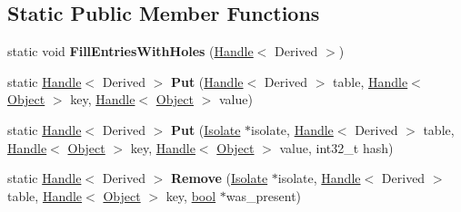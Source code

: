 \subsection*{Static Public Member Functions}
\begin{DoxyCompactItemize}
\item 
\mbox{\label{classv8_1_1internal_1_1ObjectHashTableBase_a45f343e604323fd12be43b0f861d7d16}} 
static void {\bfseries Fill\+Entries\+With\+Holes} (\mbox{\hyperlink{classv8_1_1internal_1_1Handle}{Handle}}$<$ Derived $>$)
\item 
\mbox{\label{classv8_1_1internal_1_1ObjectHashTableBase_ab9fa6b52438643808748dce949159d2f}} 
static \mbox{\hyperlink{classv8_1_1internal_1_1Handle}{Handle}}$<$ Derived $>$ {\bfseries Put} (\mbox{\hyperlink{classv8_1_1internal_1_1Handle}{Handle}}$<$ Derived $>$ table, \mbox{\hyperlink{classv8_1_1internal_1_1Handle}{Handle}}$<$ \mbox{\hyperlink{classv8_1_1internal_1_1Object}{Object}} $>$ key, \mbox{\hyperlink{classv8_1_1internal_1_1Handle}{Handle}}$<$ \mbox{\hyperlink{classv8_1_1internal_1_1Object}{Object}} $>$ value)
\item 
\mbox{\label{classv8_1_1internal_1_1ObjectHashTableBase_a514b023f883de89518605283f832b8f2}} 
static \mbox{\hyperlink{classv8_1_1internal_1_1Handle}{Handle}}$<$ Derived $>$ {\bfseries Put} (\mbox{\hyperlink{classv8_1_1internal_1_1Isolate}{Isolate}} $\ast$isolate, \mbox{\hyperlink{classv8_1_1internal_1_1Handle}{Handle}}$<$ Derived $>$ table, \mbox{\hyperlink{classv8_1_1internal_1_1Handle}{Handle}}$<$ \mbox{\hyperlink{classv8_1_1internal_1_1Object}{Object}} $>$ key, \mbox{\hyperlink{classv8_1_1internal_1_1Handle}{Handle}}$<$ \mbox{\hyperlink{classv8_1_1internal_1_1Object}{Object}} $>$ value, int32\+\_\+t hash)
\item 
\mbox{\label{classv8_1_1internal_1_1ObjectHashTableBase_a0b72c405cb871d613f1ab9b87346c82d}} 
static \mbox{\hyperlink{classv8_1_1internal_1_1Handle}{Handle}}$<$ Derived $>$ {\bfseries Remove} (\mbox{\hyperlink{classv8_1_1internal_1_1Isolate}{Isolate}} $\ast$isolate, \mbox{\hyperlink{classv8_1_1internal_1_1Handle}{Handle}}$<$ Derived $>$ table, \mbox{\hyperlink{classv8_1_1internal_1_1Handle}{Handle}}$<$ \mbox{\hyperlink{classv8_1_1internal_1_1Object}{Object}} $>$ key, \mbox{\hyperlink{classbool}{bool}} $\ast$was\+\_\+present)

\end{DoxyCompactItemize}
